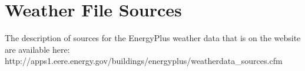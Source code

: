 \section{Weather File Sources}\label{weather-file-sources}

The description of sources for the EnergyPlus weather data that is on the website are available here: http://apps1.eere.energy.gov/buildings/energyplus/weatherdata\_sources.cfm
